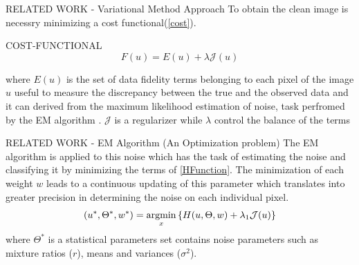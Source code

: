 \begin{frame}{RELATED WORK - Variational Method Approach}
    To obtain the clean image is necessry minimizing a cost functional(\ref{cost}).
    \begin{block}{COST-FUNCTIONAL}
        \begin{equation}\label{cost}
            F(u) = E(u)+\lambda\mathcal{J}(u)
        \end{equation}
    \end{block}
    where $E(u)$ is the set of data fidelity terms belonging to each pixel of the 
    image $u$ useful to measure the discrepancy between the true and the 
    observed data and it can derived from the maximum likelihood estimation 
    of noise, task perfromed by the EM algorithm .  $\mathcal{J}$ is a regularizer while $ \lambda $ 
    control the balance of the terms
\end{frame}

\begin{frame}{RELATED WORK - EM Algorithm (An Optimization problem)}
    The EM algorithm is applied to this noise which has the task of estimating the noise 
    and classifying it by minimizing the terms of \ref{HFunction}. The minimization of each 
    weight $w$ leads to a continuous updating of this parameter which translates 
    into greater precision in determining the noise on each individual pixel.
    \begin{equation}\label{HFunction}
        (u^*, \Theta^*, w^*) = \operatorname*{argmin}_x\left\{H(u,\Theta,w) + \lambda_1\mathcal{J}(u)\right\}
    \end{equation}
    where $\Theta^*$ is a statistical parameters set contains noise parameters such as mixture ratios ($r$), means and variances ($\sigma^2$).
\end{frame}

